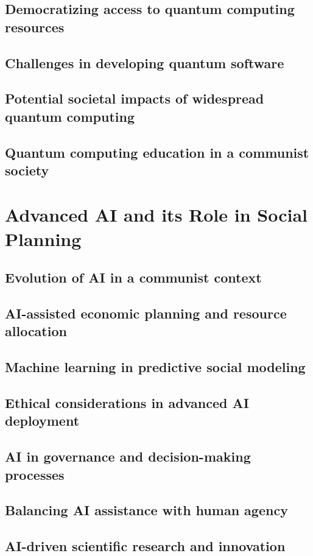 \subsection{Democratizing access to quantum computing resources}
\subsection{Challenges in developing quantum software}
\subsection{Potential societal impacts of widespread quantum computing}
\subsection{Quantum computing education in a communist society}

\newpage

\section{Advanced AI and its Role in Social Planning}
\subsection{Evolution of AI in a communist context}
\subsection{AI-assisted economic planning and resource allocation}
\subsection{Machine learning in predictive social modeling}
\subsection{Ethical considerations in advanced AI deployment}
\subsection{AI in governance and decision-making processes}
\subsection{Balancing AI assistance with human agency}
\subsection{AI-driven scientific research and innovation}
